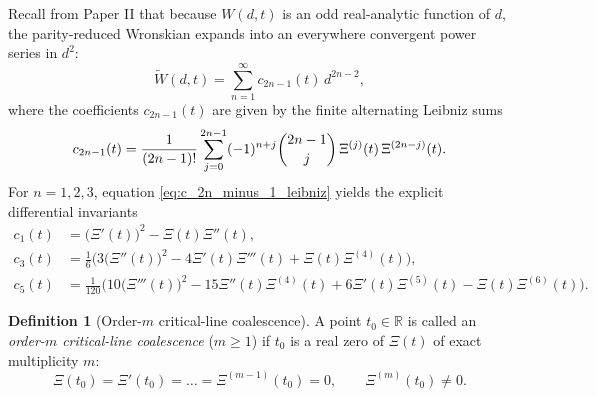 \documentclass[11pt,reqno,a4paper]{amsart}
\theoremstyle{plain}
\theoremstyle{definition}
\newtheorem{definition}[theorem]{Definition}
\theoremstyle{remark}
\numberwithin{equation}{section}
\newcommand{\fac}{\mathclose{\mathchar"0021}}
\begin{document}
Recall from Paper II \cite{MissiaenPaper2} that because $W(d,t)$ is an odd real-analytic function of $d$, the parity-reduced Wronskian expands into an everywhere convergent power series in $d^2$:
\begin{equation}\label{eq:W_tilde_power_series}
  \widetilde{W}(d,t) = \sum_{n=1}^{\infty} c_{2n-1}(t)\,d^{2n-2},
\end{equation}
where the coefficients $c_{2n-1}(t)$ are given by the finite alternating Leibniz sums
\begin{equation}\label{eq:c_2n_minus_1_leibniz}
  c_{2n-1}(t) = \frac{1}{(2n-1)\fac}\sum_{j=0}^{2n-1}(-1)^{n+j}\binom{2n-1}{j}\,\Xi^{(j)}(t)\,\Xi^{(2n-j)}(t).
\end{equation}
For $n=1,2,3$, equation \eqref{eq:c_2n_minus_1_leibniz} yields the explicit differential invariants
\begin{align}
  c_1(t) &= \big(\Xi'(t)\big)^2 - \Xi(t)\Xi''(t), \label{eq:c1_explicit} \\
  c_3(t) &= \frac{1}{6}\Big(3\big(\Xi''(t)\big)^2 - 4\Xi'(t)\Xi'''(t) + \Xi(t)\Xi^{(4)}(t)\Big), \label{eq:c3_explicit} \\
  c_5(t) &= \frac{1}{120}\Big(10\big(\Xi'''(t)\big)^2 - 15\Xi''(t)\Xi^{(4)}(t) + 6\Xi'(t)\Xi^{(5)}(t) - \Xi(t)\Xi^{(6)}(t)\Big). \label{eq:c5_explicit}
\end{align}

\begin{definition}[Order-$m$ critical-line coalescence]\label{def:order_m_coalescence}
A point $t_0 \in \mathbb{R}$ is called an \emph{order-$m$ critical-line coalescence} ($m \ge 1$) if $t_0$ is a real zero of $\Xi(t)$ of exact multiplicity $m$:
\begin{equation}\label{eq:order_m_def}
  \Xi(t_0) = \Xi'(t_0) = \dots = \Xi^{(m-1)}(t_0) = 0, \qquad \Xi^{(m)}(t_0) \neq 0.
\end{equation}
\end{definition}
\end{document}
